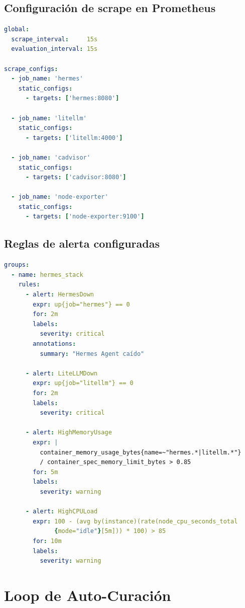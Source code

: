 \subsection{Configuración de scrape en Prometheus}

\begin{lstlisting}[language=yaml,caption=config/prometheus.yml (fragmento)]
global:
  scrape_interval:     15s
  evaluation_interval: 15s

scrape_configs:
  - job_name: 'hermes'
    static_configs:
      - targets: ['hermes:8080']

  - job_name: 'litellm'
    static_configs:
      - targets: ['litellm:4000']

  - job_name: 'cadvisor'
    static_configs:
      - targets: ['cadvisor:8080']

  - job_name: 'node-exporter'
    static_configs:
      - targets: ['node-exporter:9100']
\end{lstlisting}

\subsection{Reglas de alerta configuradas}

\begin{lstlisting}[language=yaml,caption=config/alerts.yml — reglas críticas]
groups:
  - name: hermes_stack
    rules:
      - alert: HermesDown
        expr: up{job="hermes"} == 0
        for: 2m
        labels:
          severity: critical
        annotations:
          summary: "Hermes Agent caído"

      - alert: LiteLLMDown
        expr: up{job="litellm"} == 0
        for: 2m
        labels:
          severity: critical

      - alert: HighMemoryUsage
        expr: |
          container_memory_usage_bytes{name=~"hermes.*|litellm.*"}
          / container_spec_memory_limit_bytes > 0.85
        for: 5m
        labels:
          severity: warning

      - alert: HighCPULoad
        expr: 100 - (avg by(instance)(rate(node_cpu_seconds_total
              {mode="idle"}[5m])) * 100) > 85
        for: 10m
        labels:
          severity: warning
\end{lstlisting}

\section{Loop de Auto-Curación}

